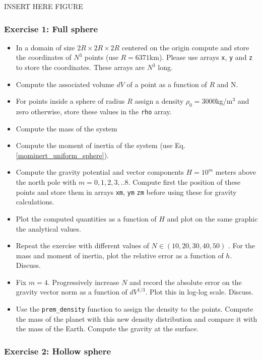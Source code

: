INSERT HERE FIGURE


\subsubsection*{Exercise 1: Full sphere}

\begin{itemize}
\item In a domain of size $2R\times 2R \times 2R$ centered on the origin compute and store the coordinates 
of $N^3$ points (use $R=6371$km). Please use arrays {\tt x}, {\tt y} and {\tt z} to store the coordinates.
These arrays are $N^3$ long.
\item Compute the associated volume $dV$ of a point as a function of $R$ and N.
\item For points inside a sphere of radius $R$ assign a density $\rho_0=3000$kg/m$^3$ and zero otherwise, store these values in the {\tt rho} array.
\item Compute the mass of the system 
\item Compute the moment of inertia of the system (use Eq. \ref{mominert_uniform_sphere}).
\item Compute the gravity potential and vector components $H=10^m$ meters above the north pole 
with $m=0,1,2,3,..8$. Compute first the position of these points and store them 
in arrays {\tt xm}, {\tt ym} {\tt zm} before using these for gravity calculations. 
\item Plot the computed quantities as a function of $H$ and plot on the same graphic the analytical values. 
\item Repeat the exercise with different values of $N\in(10,20,30,40,50)$ .
For the mass and moment of inertia, plot the relative error as a function of $h$.
Discuss.
\item Fix $m=4$. Progressively increase $N$ and record the absolute error on the gravity vector norm 
as a function of $dV^{1/3}$. Plot this in log-log scale. Discuss.
\item Use the {\tt prem\_density} function to assign the density to the points. Compute the mass of the planet with this new density distribution and compare it with the mass of the Earth. Compute the gravity at the surface.
\end{itemize}

\subsubsection*{Exercise 2: Hollow sphere}


